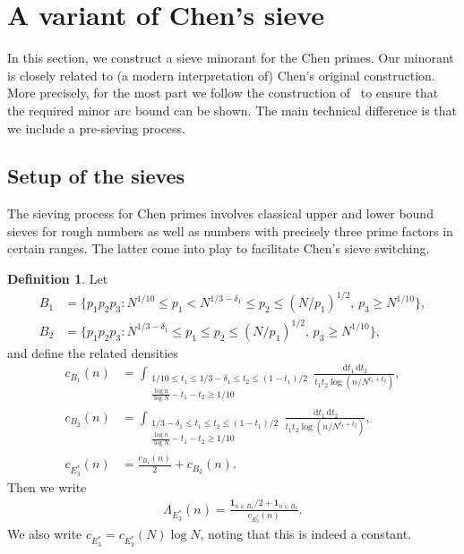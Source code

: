 \documentclass[12pt]{amsart}
\theoremstyle{definition}
\newtheorem{definition}[theorem]{Definition}
\theoremstyle{remark}
\numberwithin{equation}{section}
\newcommand{\1}{\mathbf{1}}
\renewcommand\d{\,\mathrm{d}}
\begin{document}
 \section{A variant of Chen's sieve} \label{sec:Chen Sieve}
 In this section, we construct a sieve minorant for the Chen primes. Our minorant is closely related to (a modern interpretation of) Chen's original construction. More precisely, for the most part we follow the construction of~\cite[Appendix A]{matomaki-shao} to ensure that the required minor arc bound can be shown. The main technical difference is that we include a pre-sieving process. 

 \subsection{Setup of the sieves}
The sieving process for Chen primes involves classical upper and lower bound sieves for rough numbers as well as numbers with precisely three prime factors in certain ranges. The latter come into play to facilitate Chen's sieve switching. 

\begin{definition}\label{def:lambdaE3}
Let 
\begin{align} \label{eq:B1def}
 B_1&=\{p_1p_2p_3: N^{1/10}\leq p_1<N^{1/3-\delta_1}\leq p_2\leq (N/p_1)^{1/2},\,p_3\geq N^{1/10}\},\\
\label{eq:B2def}
B_2&=\{p_1p_2p_3:N^{1/3-\delta_1}\leq p_1\leq p_2\leq (N/p_1)^{1/2},\,p_3\geq N^{1/10}\},
\end{align}
and define the related densities
\begin{align*}
    c_{B_1}(n)&=\int_{\substack{1/10\leq t_1\leq 1/3-\delta_1\leq t_2\leq (1-t_1)/2\\ \frac{\log n}{\log N}-t_1-t_2\geq 1/10}}\frac{\d t_1 \d t_2}{t_1t_2\log (n/N^{t_1+t_2})},\\
     c_{B_2}(n)&=\int_{\substack{1/3-\delta_1 \leq t_1\leq t_2\leq (1-t_1)/2\\ \frac{\log n}{\log N}-t_1-t_2\geq 1/10}}\frac{\d t_1 \d t_2}{t_1t_2\log (n/N^{t_1+t_2})},\\
     c_{E_3^*}(n)&=\frac{c_{B_1}(n)}{2}+c_{B_2}(n).
\end{align*}
Then we write
\begin{align}\label{eq:L3def}
\Lambda_{E_3^{*}}(n)=\frac{\1_{n\in B_1}/2+\1_{n\in B_2}}{c_{E_3^*}(n)}.
\end{align}
We also write $c_{E_3^*}=c_{E_3^*}(N) \log N$, noting that this is indeed a constant.
\end{definition}
\end{document}
